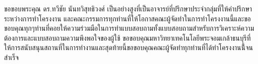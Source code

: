 \documentclass[12pt,oneside,openright,a4paper]{cpe-thai-project}
\begin{document}

\preface
\hspace{18pt}ขอขอบพระคุณ ดร.ทวีชัย นันทวิสุทธิวงศ์ เป็นอย่างสูงที่เป็นอาจารย์ที่ปรึกษาประจำกลุ่มที่ให้คำปรึกษาระหว่างการทำโครงงาน และคณะกรรมการทุกท่านที่ให้โอกาสคณะผู้จัดทำในการทำโครงงานนี้และขอขอบคุณทุกๆท่านที่คอยให้ความร่วมมือในการทำแบบสอบถามทั้งแบบสอบถามสำหรับการวิเคราะห์ความต้องการและแบบสอบถามความพึงพอใจของผู้ใช้ ขอขอบคุณมหาวิทยาเทคโนโลยีพระจอมเกล้าธนบุรีที่ให้การสนับสนุนสถานที่ในการทำงานและสุดท้ายนี้ขอขอบคุณคณะผู้จัดทำทุกท่านที่ได้ทำโครงงานนี้้จนสำเร็จ

\tableofcontents
\listoftables
\listoffigures

\end{document}
